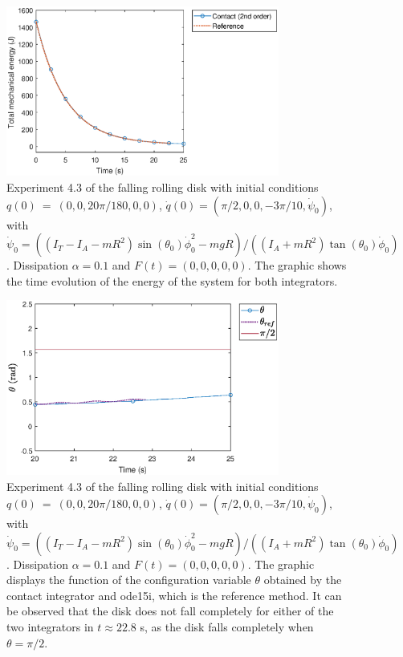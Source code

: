\documentclass{aims}
\numberwithin{equation}{section}
\theoremstyle{definition}
\begin{document}
\begin{figure}
  \centering
  \includegraphics[width=0.8\textwidth]{fig/43energia.eps}
  \caption{Experiment 4.3 of the falling rolling disk with initial conditions $q(0)~=~(0,0,20\pi/180,0,0)$, $\dot{q}(0) = (\pi/2,0,0,-3\pi/10,\dot{\psi}_0)$, with $\dot{\psi}_0 = ((I_T - I_A - m R^2) \sin(\theta_0) \dot{\phi}_0^2 - m g R)/((I_A + m R^2) \tan(\theta_0) \dot{\phi}_0)$. Dissipation $\alpha = 0.1$ and $F(t) = (0,0,0,0,0)$. The graphic shows the time evolution of the energy of the system for both integrators.}
  \label{fig:disco_experimento_4_3_3}
\end{figure}

\begin{figure}
  \centering
  \includegraphics[width=0.8\textwidth]{fig/43theta.eps}
  \caption{Experiment 4.3 of the falling rolling disk with initial conditions $q(0)~=~(0,0,20\pi/180,0,0)$, $\dot{q}(0) = (\pi/2,0,0,-3\pi/10,\dot{\psi}_0)$, with $\dot{\psi}_0 = ((I_T - I_A - m R^2) \sin(\theta_0) \dot{\phi}_0^2 - m g R)/((I_A + m R^2) \tan(\theta_0) \dot{\phi}_0)$. Dissipation $\alpha = 0.1$ and $F(t) = (0,0,0,0,0)$. The graphic displays the function of the configuration variable $\theta$ obtained by the contact integrator and ode15i, which is the reference method. It can be observed that the disk does not fall completely for either of the two integrators in $t \approx 22.8$ s, as the disk falls completely when $\theta = \pi/2$.}
  \label{fig:disco_experimento_4_3_4}
\end{figure}
\end{document}
